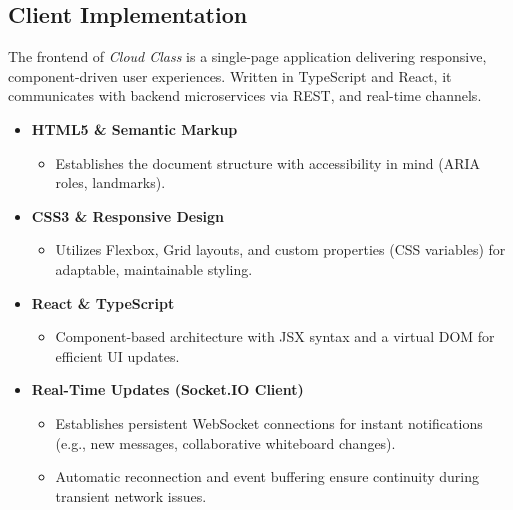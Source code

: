 \subsection{Client Implementation}

The frontend of \emph{Cloud Class} is a single-page application delivering responsive, component-driven user experiences.  Written in TypeScript and React, it communicates with backend microservices via REST, and real-time channels.

\begin{itemize}
  \item \textbf{HTML5 \& Semantic Markup}  
    \begin{itemize}
      \item Establishes the document structure with accessibility in mind (ARIA roles, landmarks).  
    \end{itemize}

  \item \textbf{CSS3 \& Responsive Design}  
    \begin{itemize}
      \item Utilizes Flexbox, Grid layouts, and custom properties (CSS variables) for adaptable, maintainable styling.  
    \end{itemize}

  \item \textbf{React \& TypeScript}  
    \begin{itemize}
      \item Component-based architecture with JSX syntax and a virtual DOM for efficient UI updates.  
    \end{itemize}

  \item \textbf{Real-Time Updates (Socket.IO Client)}  
    \begin{itemize}
      \item Establishes persistent WebSocket connections for instant notifications (e.g., new messages, collaborative whiteboard changes).  
      \item Automatic reconnection and event buffering ensure continuity during transient network issues.
    \end{itemize}
\end{itemize}

